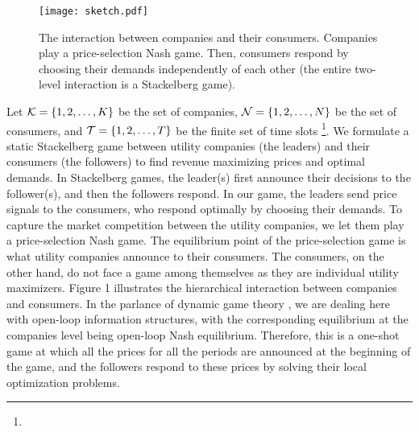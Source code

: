 \begin{figure}
\centering
\texttt{[image: sketch.pdf]}
\caption{The interaction between companies and their consumers. Companies play a price-selection Nash game. Then, consumers respond by choosing their demands independently of each other (the entire two-level interaction is a Stackelberg game).}
\label{sketch}
\end{figure}
Let ${\cal K}=\{1,2,\dots,K\}$ be the set of companies, ${\cal N}=\{1,2,\dots,N\}$ be the set of consumers, and ${\cal T}=\{1,2,\dots,T\}$ be the finite set of time slots \footnote{\color{blue}{In this paper, we interchangeably use ``time slot" and ``period" to refer to a subdivision of the time horizon.}}.
We formulate a static Stackelberg game between utility companies (the leaders) and their consumers (the followers) to find revenue maximizing prices and optimal demands. In Stackelberg games, the leader(s) first announce their decisions to the follower(s), and then the followers respond. In our game, the leaders send price signals to the consumers, who respond optimally by choosing their demands. To capture the  market competition between the utility companies, we let them play a price-selection Nash game. The equilibrium point of the price-selection game is what utility companies announce to their consumers. The consumers, on the other hand, do not face a game among themselves as they are individual utility maximizers. Figure 1 illustrates the hierarchical interaction between companies and consumers. 
In the parlance of dynamic game theory \cite{basar}, we are dealing here with open-loop information structures, with the corresponding equilibrium at the companies level being open-loop Nash equilibrium. Therefore, this is a one-shot game at which all the prices for all the periods are announced at the beginning of the game, and the followers respond to these prices by solving their local optimization problems. 
